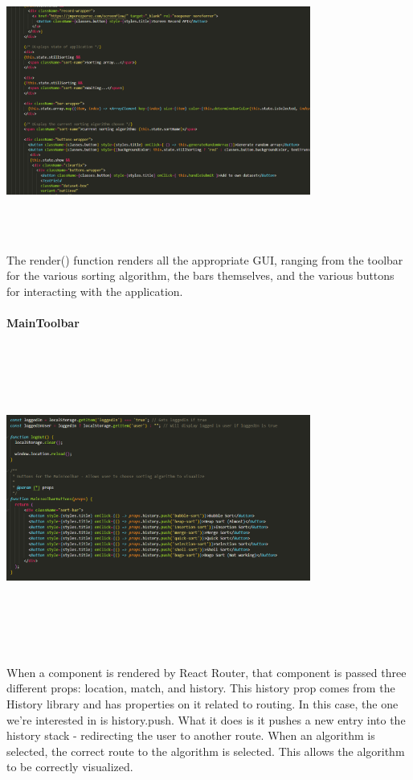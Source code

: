 \begin{center}
    \includegraphics[width=10cm,height=9cm,keepaspectratio]{images/mainpage8}
\end{center}
The render() function renders all the appropriate GUI, ranging from the toolbar for the various sorting algorithm, the bars themselves, and the various buttons for interacting with the application.

\paragraph{MainToolbar}
\begin{center}
    \includegraphics[width=10cm,height=10cm,keepaspectratio]{images/toolbar1}
\end{center}
When a component is rendered by React Router, that component is passed three different props: location, match, and history. This history prop comes from the History library and has properties on it related to routing. In this case, the one we’re interested in is history.push. What it does is it pushes a new entry into the history stack - redirecting the user to another route. When an algorithm is selected, the correct route to the algorithm is selected. This allows the algorithm to be correctly visualized.

